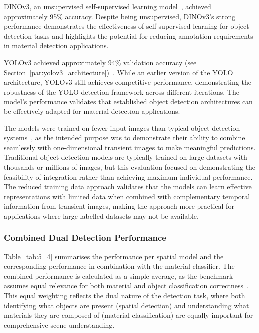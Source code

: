 \documentclass[12pt,a4paper,oneside]{report}
\begin{document}
DINOv3, an unsupervised self-supervised learning model~\cite{simeoni2025}, achieved approximately 95\% accuracy. Despite being unsupervised, DINOv3's strong performance demonstrates the effectiveness of self-supervised learning for object detection tasks and highlights the potential for reducing annotation requirements in material detection applications.

YOLOv3 achieved approximately 94\% validation accuracy (see Section~\ref{par:yolov3_architecture})~\cite{redmon2018}. While an earlier version of the YOLO architecture, YOLOv3 still achieves competitive performance, demonstrating the robustness of the YOLO detection framework across different iterations. The model's performance validates that established object detection architectures can be effectively adapted for material detection applications.

The models were trained on fewer input images than typical object detection systems~\cite{edozie2025}, as the intended purpose was to demonstrate their ability to combine seamlessly with one-dimensional transient images to make meaningful predictions. Traditional object detection models are typically trained on large datasets with thousands or millions of images, but this evaluation focused on demonstrating the feasibility of integration rather than achieving maximum individual performance. The reduced training data approach validates that the models can learn effective representations with limited data when combined with complementary temporal information from transient images, making the approach more practical for applications where large labelled datasets may not be available.

\subsubsection{Combined Dual Detection Performance}
\label{subsec:combined_dual_detection_performance}

Table~\ref{tab:5_4} summarises the performance per spatial model and the corresponding performance in combination with the material classifier. The combined performance is calculated as a simple average, as the benchmark assumes equal relevance for both material and object classification correctness~\cite{gadzicki2020}. This equal weighting reflects the dual nature of the detection task, where both identifying what objects are present (spatial detection) and understanding what materials they are composed of (material classification) are equally important for comprehensive scene understanding.
\end{document}
